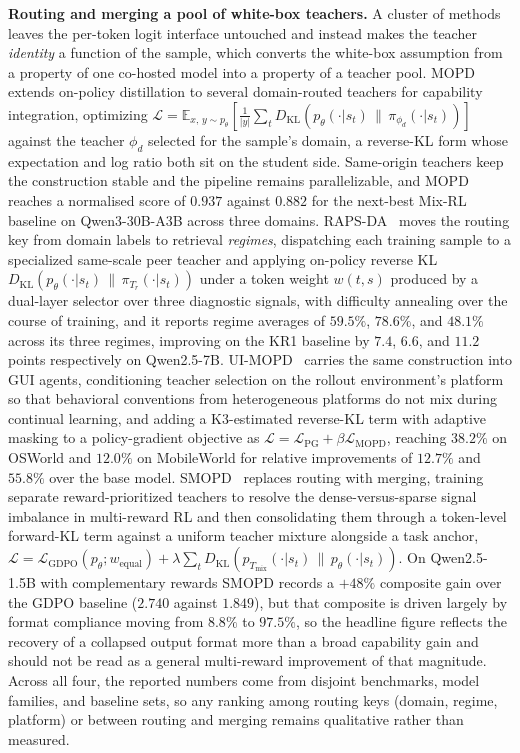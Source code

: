 \documentclass{article} %
\newcommand{\E}{\mathbb{E}}
\newcommand{\KL}{D_{\mathrm{KL}}}
\newcommand{\ptheta}{p_\theta}
\newcommand{\loss}{\mathcal{L}}
\begin{document}
\textbf{Routing and merging a pool of white-box teachers.} A cluster of methods leaves the per-token logit interface untouched and instead makes the teacher \emph{identity} a function of the sample, which converts the white-box assumption from a property of one co-hosted model into a property of a teacher pool. MOPD~\citep{2606.30406} extends on-policy distillation to several domain-routed teachers for capability integration, optimizing $\loss = \E_{x,\, y \sim \ptheta}[\frac{1}{|y|}\sum_t \KL(\ptheta(\cdot|s_t) \,\|\, \pi_{\phi_d}(\cdot|s_t))]$ against the teacher $\phi_d$ selected for the sample's domain, a reverse-KL form whose expectation and log ratio both sit on the student side. Same-origin teachers keep the construction stable and the pipeline remains parallelizable, and MOPD reaches a normalised score of $0.937$ against $0.882$ for the next-best Mix-RL baseline on Qwen3-30B-A3B across three domains. RAPS-DA~\citep{2606.30518} moves the routing key from domain labels to retrieval \emph{regimes}, dispatching each training sample to a specialized same-scale peer teacher and applying on-policy reverse KL $\KL(\ptheta(\cdot|s_t) \,\|\, \pi_{T_r}(\cdot|s_t))$ under a token weight $w(t,s)$ produced by a dual-layer selector over three diagnostic signals, with difficulty annealing over the course of training, and it reports regime averages of $59.5\%$, $78.6\%$, and $48.1\%$ across its three regimes, improving on the KR1 baseline by $7.4$, $6.6$, and $11.2$ points respectively on Qwen2.5-7B. UI-MOPD~\citep{2607.04425} carries the same construction into GUI agents, conditioning teacher selection on the rollout environment's platform so that behavioral conventions from heterogeneous platforms do not mix during continual learning, and adding a K3-estimated reverse-KL term with adaptive masking to a policy-gradient objective as $\loss = \loss_{\text{PG}} + \beta \loss_{\text{MOPD}}$, reaching $38.2\%$ on OSWorld and $12.0\%$ on MobileWorld for relative improvements of $12.7\%$ and $55.8\%$ over the base model. SMOPD~\citep{2608.03092} replaces routing with merging, training separate reward-prioritized teachers to resolve the dense-versus-sparse signal imbalance in multi-reward RL and then consolidating them through a token-level forward-KL term against a uniform teacher mixture alongside a task anchor, $\loss = \loss_{\text{GDPO}}(\ptheta; w_{\text{equal}}) + \lambda \sum_t \KL(p_{T_{\text{mix}}}(\cdot|s_t) \,\|\, p_\theta(\cdot|s_t))$. On Qwen2.5-1.5B with complementary rewards SMOPD records a $+48\%$ composite gain over the GDPO baseline ($2.740$ against $1.849$), but that composite is driven largely by format compliance moving from $8.8\%$ to $97.5\%$, so the headline figure reflects the recovery of a collapsed output format more than a broad capability gain and should not be read as a general multi-reward improvement of that magnitude. Across all four, the reported numbers come from disjoint benchmarks, model families, and baseline sets, so any ranking among routing keys (domain, regime, platform) or between routing and merging remains qualitative rather than measured.
\end{document}
